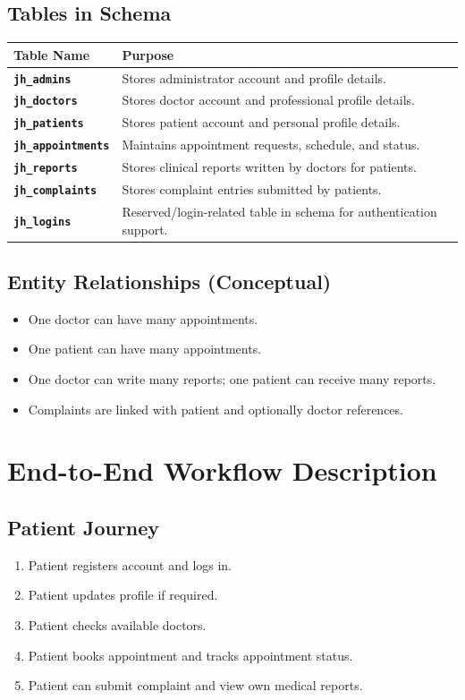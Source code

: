 \documentclass[12pt,a4paper]{article}
\begin{document}
\subsection{Tables in Schema}
\begin{tabularx}{\linewidth}{>{\bfseries}p{4cm} X}
\toprule
Table Name & Purpose \\
\midrule
\texttt{jh\_admins} & Stores administrator account and profile details. \\
\texttt{jh\_doctors} & Stores doctor account and professional profile details. \\
\texttt{jh\_patients} & Stores patient account and personal profile details. \\
\texttt{jh\_appointments} & Maintains appointment requests, schedule, and status. \\
\texttt{jh\_reports} & Stores clinical reports written by doctors for patients. \\
\texttt{jh\_complaints} & Stores complaint entries submitted by patients. \\
\texttt{jh\_logins} & Reserved/login-related table in schema for authentication support. \\
\bottomrule
\end{tabularx}

\subsection{Entity Relationships (Conceptual)}
\begin{itemize}[leftmargin=1.2cm]
    \item One doctor can have many appointments.
    \item One patient can have many appointments.
    \item One doctor can write many reports; one patient can receive many reports.
    \item Complaints are linked with patient and optionally doctor references.
\end{itemize}

\section{End-to-End Workflow Description}
\subsection{Patient Journey}
\begin{enumerate}[leftmargin=1.2cm]
    \item Patient registers account and logs in.
    \item Patient updates profile if required.
    \item Patient checks available doctors.
    \item Patient books appointment and tracks appointment status.
    \item Patient can submit complaint and view own medical reports.
\end{enumerate}
\end{document}

